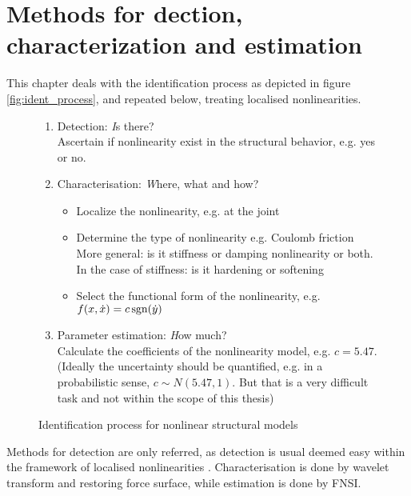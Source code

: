 
\chapter{Methods for dection, characterization and estimation}
\label{chap:methods_dec_char_est}

This chapter deals with the identification process as depicted in figure
\ref{fig:ident_process}, and repeated below, treating localised nonlinearities.

\begin{figure}[ht!]
  \centering
  \begin{mdframed}
    \begin{enumerate}
    \item Detection: {\textit Is there?}\\
      Ascertain if nonlinearity exist in the structural behavior, e.g. yes or
      no.
    \item Characterisation: {\textit Where, what and how?}
      \begin{itemize}
      \item Localize the nonlinearity, e.g. at the joint
      \item Determine the type of nonlinearity e.g.  Coulomb friction\\
        More general: is it stiffness or damping nonlinearity or both. In the
        case of stiffness: is it hardening or softening
      \item Select the functional form of the nonlinearity, e.g.
        $f(x,\dot x) = c \operatorname{sgn} (\dot y)$
      \end{itemize}
    \item Parameter estimation: {\textit How much?}\\
      Calculate the coefficients of the nonlinearity model, e.g. $c = 5.47$.\\
      (Ideally the uncertainty should be quantified, e.g. in a probabilistic
      sense, $c \sim N(5.47,1)$. But that is a very difficult task and not
      within the scope of this thesis)
    \end{enumerate}
  \end{mdframed}
  \caption{Identification process for nonlinear structural models}
\end{figure}


Methods for detection are only referred, as detection is usual deemed easy
within the framework of localised nonlinearities \autocite{noel2016a}.
Characterisation is done by wavelet transform and restoring force surface, while
estimation is done by FNSI.


